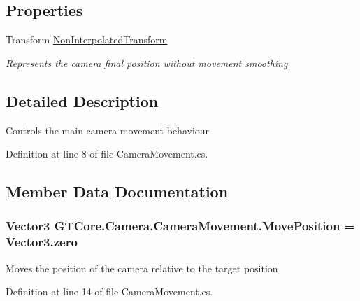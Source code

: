 \subsection*{Properties}
\begin{DoxyCompactItemize}
\item 
Transform \hyperlink{class_g_t_core_1_1_camera_1_1_camera_movement_ae91326322724ddf4ef145703e4b16eba}{Non\+Interpolated\+Transform}
\begin{DoxyCompactList}\small\item\em Represents the camera final position without movement smoothing \end{DoxyCompactList}\end{DoxyCompactItemize}


\subsection{Detailed Description}
Controls the main camera movement behaviour 



Definition at line 8 of file Camera\+Movement.\+cs.



\subsection{Member Data Documentation}
\hypertarget{class_g_t_core_1_1_camera_1_1_camera_movement_a41c414edba414aada8b4a60a81dfe645}{}
\subsubsection[{Move\+Position}]{\setlength{\rightskip}{0pt plus 5cm}Vector3 G\+T\+Core.\+Camera.\+Camera\+Movement.\+Move\+Position = Vector3.\+zero}\label{class_g_t_core_1_1_camera_1_1_camera_movement_a41c414edba414aada8b4a60a81dfe645}


Moves the position of the camera relative to the target position 



Definition at line 14 of file Camera\+Movement.\+cs.

\hypertarget{class_g_t_core_1_1_camera_1_1_camera_movement_a6e6ee6e6693f79f8280cbd3a00787f01}{}
